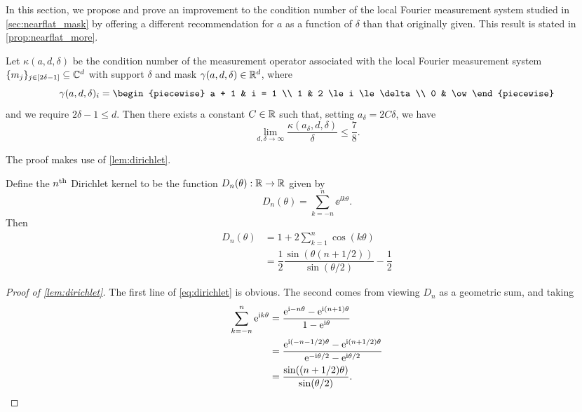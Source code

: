 In this section, we propose and prove an improvement to the condition number of the local Fourier measurement system studied in \cref{sec:nearflat_mask} by offering a different recommendation for $a$ as a function of $\delta$ than that originally given.  This result is stated in \cref{prop:nearflat_more}.

\begin{proposition}
  Let $\kappa(a, d, \delta)$ be the condition number of the measurement operator associated with the local Fourier measurement system $\{m_j\}_{j \in [2 \delta - 1]} \subseteq \mathbb{C}^d$ with support $\delta$ and mask $\gamma(a, d, \delta) \in \mathbb{R}^d$, where \[\gamma(a, d, \delta)_i = \begin{piecewise} a + 1 & i = 1 \\ 1 & 2 \le i \le \delta \\ 0 & \ow \end{piecewise}\] and we require $2 \delta - 1 \le d$.  Then there exists a constant $C \in \mathbb{R}$ such that, setting $a_\delta = 2 C \delta$, we have \[\lim_{d, \delta \to \infty} \dfrac{\kappa(a_\delta, d, \delta)}{\delta} \le \frac{7}{8}.\]

  \label{prop:nearflat_more}
\end{proposition}

The proof makes use of \cref{lem:dirichlet}.

\begin{lemma}
  Define the $n^{\text{th}}$ Dirichlet kernel to be the function $D_n(\theta) : \mathbb{R} \to \mathbb{R}$ given by \[D_n(\theta) = \sum_{k = -n}^n \ee^{\ii k \theta}.\]  Then 
  \begin{equation}
    \begin{aligned}
      D_n(\theta) &= 1 + 2 \sum_{k = 1}^n \cos(k \theta) \\
      &= \dfrac{1}{2} \dfrac{\sin(\theta (n + 1/2))}{\sin(\theta / 2)} - \dfrac{1}{2}
    \end{aligned}
    \label{eq:dirichlet}
  \end{equation}
  \label{lem:dirichlet}
\end{lemma}

\begin{proof}[Proof of \cref{lem:dirichlet}]
  The first line of \eqref{eq:dirichlet} is obvious.  The second comes from viewing $D_n$ as a geometric sum, and taking
  \begin{align*}
    \sum_{k = -n}^n \mathrm{e}^{\mathrm{i} k \theta} &= \dfrac{\mathrm{e}^{\mathrm{i} -n \theta} - \mathrm{e}^{\mathrm{i} (n + 1)\theta}}{1 - \mathrm{e}^{\mathrm{i} \theta}} \\
    &= \dfrac{\mathrm{e}^{\mathrm{i} (-n - 1/2) \theta} - \mathrm{e}^{\mathrm{i} (n + 1/2) \theta}}{\mathrm{e}^{-\mathrm{i} \theta / 2} - \mathrm{e}^{\mathrm{i} \theta / 2}} \\
    &= \dfrac{\sin((n + 1/2) \theta)}{\sin(\theta / 2)}.
  \end{align*}
\end{proof}

